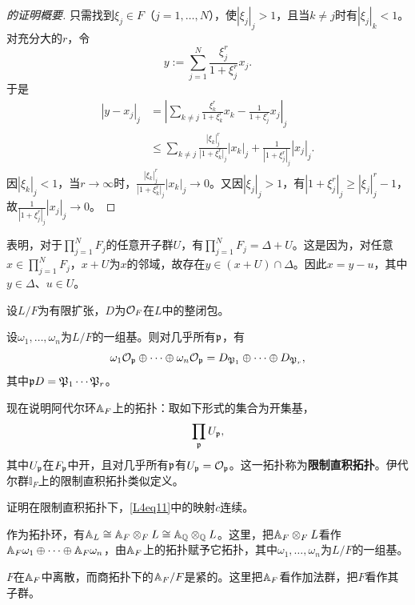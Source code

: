 \begin{proof}[的证明概要]
只需找到$\xi_j\in F$（$j=1,\ldots,N$），使$|\xi_j|_j>1$，且当$k\ne j$时有$|\xi_j|_k<1$。对充分大的$r$，令
\[y:=\sum_{j=1}^N\frac{\xi_j^r}{1+\xi_j^r}x_j.\]
于是
\begin{align*}
|y-x_j|_j&=\left|\sum_{k\ne j}\frac{\xi_k^r}{1+\xi_k^r}x_k-\frac1{1+\xi_j^r}x_j\right|_j\\
&\leq\sum_{k\ne j}\frac{|\xi_k|_j^r}{|1+\xi_k^r|_j}|x_k|_j+\frac1{|1+\xi_j^r|_j}|x_j|_j.
\end{align*}
因$|\xi_k|_j<1$，当$r\to\infty$时，$\frac{|\xi_k|_j^r}{|1+\xi_k^r|_j}|x_k|_j\to0$。又因$|\xi_j|_j>1$，有$|1+\xi_j^r|_j\geq|\xi_j|_j^r-1$，故$\frac1{|1+\xi_j^r|_j}|x_j|_j\to0$。
\end{proof}
\begin{note}[L4S1O5]
表明，对于$\prod_{j=1}^NF_j$的任意开子群$U$，有$\prod_{j=1}^NF_j=\Delta+U$。这是因为，对任意$x\in\prod_{j=1}^NF_j$，$x+U$为$x$的邻域，故存在$y\in(x+U)\cap\Delta$。因此$x=y-u$，其中$y\in\Delta$、$u\in U$。
\end{note}
设$L/F$为有限扩张，$D$为$\mathcal O_F$在$L$中的整闭包。
\begin{lemma}\label{L4S1O6}
设$\omega_1,\ldots,\omega_n$为$L/F$的一组基。则对几乎所有$\mathfrak{p}$，有
\[\omega_1\mathcal O_{\mathfrak{p}}\oplus\cdots\oplus\omega_n\mathcal O_{\mathfrak{p}}=D_{\mathfrak{P}_1}\oplus\cdots\oplus D_{\mathfrak{P}_r},\]
其中$\mathfrak{p} D=\mathfrak{P}_1\cdots\mathfrak{P}_r$。
\end{lemma}
现在说明阿代尔环$\mathbb{A}_F$上的拓扑：取如下形式的集合为开集基，
\[\prod_{\mathfrak{p}}U_{\mathfrak{p}},\]
其中$U_{\mathfrak{p}}$在$F_{\mathfrak{p}}$中开，且对几乎所有$\mathfrak{p}$有$U_{\mathfrak{p}}=\mathcal O_{\mathfrak{p}}$。这一拓扑称为\textbf{限制直积拓扑}。伊代尔群$\mathbb{I}_F$上的限制直积拓扑类似定义。
\begin{exercise*}\label{L4S1EX2}
证明在限制直积拓扑下，\eqref{L4eq11}中的映射$c$连续。
\end{exercise*}
\begin{proposition}\label{L4S1O7}
作为拓扑环，有$\mathbb{A}_L\cong\mathbb{A}_F\otimes_F L\cong\mathbb{A}_{\mathbb{Q}}\otimes_{\mathbb{Q}} L$。这里，把$\mathbb{A}_F\otimes_F L$看作$\mathbb{A}_F\omega_1\oplus\cdots\oplus\mathbb{A}_F\omega_n$，由$\mathbb{A}_F$上的拓扑赋予它拓扑，其中$\omega_1,\ldots,\omega_n$为$L/F$的一组基。
\end{proposition}
\begin{theorem}\label{L4S1O8}
$F$在$\mathbb{A}_F$中离散，而商拓扑下的$\mathbb{A}_F/F$是紧的。这里把$\mathbb{A}_F$看作加法群，把$F$看作其子群。
\end{theorem}
